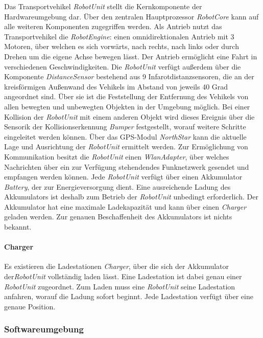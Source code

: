   Das Transportvehikel \emph{RobotUnit} stellt die Kernkomponente der Hardwareumgebung dar.
  Über den zentralen Hauptprozessor \emph{RobotCore} kann auf alle weiteren Komponenten zugegriffen werden.
  Als Antrieb nutzt das Transportvehikel die \emph{RobotEngine}: einen omnidirektionalen Antrieb mit 3 Motoren, über welchen es sich vorwärts, nach rechts, nach links oder durch Drehen um die eigene Achse bewegen lässt.
  Der Antrieb ermöglicht eine Fahrt in verschiedenen Geschwindigkeiten.
  Die \emph{RobotUnit} verfügt außerdem über die Komponente \emph{DistanceSensor} bestehend aus 9 Infarotdistanzsensoren, die an der kreisförmigen Außenwand des Vehikels im Abstand von jeweils 40 Grad angeordnet sind.
  Über sie ist die Feststellung der Entfernung des Vehikels von allen bewegten und unbewegten Objekten in der Umgebung möglich.
  Bei einer Kollision der \emph{RobotUnit} mit einem anderen Objekt wird dieses Ereignis über die Sensorik der Kollisionserkennung \emph{Bumper} festgestellt, worauf weitere Schritte eingeleitet werden können.
  Über das GPS-Modul \emph{NorthStar} kann die aktuelle Lage und Ausrichtung der \emph{RobotUnit} ermittelt werden.
  Zur Ermöglichung von Kommunikation besitzt die \emph{RobotUnit} einen \emph{WlanAdapter}, über welches Nachrichten über ein zur Verfügung stehendendes Funknetzwerk gesendet und empfangen werden können.
  Jede \emph{RobotUnit} verfügt über einen Akkumulator \emph{Battery}, der zur Energieversorgung dient.
  Eine ausreichende Ladung des Akkumulators ist deshalb zum Betrieb der \emph{RobotUnit} unbedingt erforderlich.
  Der Akkumulator hat eine maximale Ladekapazität und kann über einen \emph{Charger} geladen werden.
  Zur genauen Beschaffenheit des Akkumulators ist nichts bekannt.

  \paragraph{Charger}\label{charger}

  Es existieren die Ladestationen \emph{Charger}, über die sich der Akkumulator der\emph{RobotUnit} vollständig laden lässt.
  Eine Ladestation ist dabei genau einer \emph{RobotUnit} zugeordnet.
  Zum Laden muss eine \emph{RobotUnit} seine Ladestation anfahren, worauf die Ladung sofort beginnt.
  Jede Ladestation verfügt über eine genaue Position.

    \subsubsection{Softwareumgebung}

